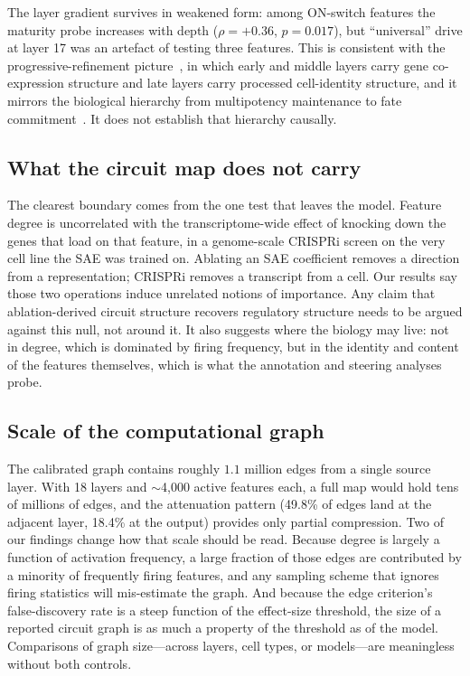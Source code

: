 \documentclass[11pt,onecolumn]{article}
\begin{document}
The layer gradient survives in weakened form: among ON-switch features the maturity probe increases with depth ($\rho=+0.36$, $p=0.017$), but ``universal'' drive at layer 17 was an artefact of testing three features. This is consistent with the progressive-refinement picture~\citep{kendiukhov2025circuits}, in which early and middle layers carry gene co-expression structure and late layers carry processed cell-identity structure, and it mirrors the biological hierarchy from multipotency maintenance to fate commitment~\citep{orkin2008hematopoiesis,graf2009forcing}. It does not establish that hierarchy causally.

\subsection{What the circuit map does not carry}

The clearest boundary comes from the one test that leaves the model. Feature degree is uncorrelated with the transcriptome-wide effect of knocking down the genes that load on that feature, in a genome-scale CRISPRi screen on the very cell line the SAE was trained on. Ablating an SAE coefficient removes a direction from a representation; CRISPRi removes a transcript from a cell. Our results say those two operations induce unrelated notions of importance. Any claim that ablation-derived circuit structure recovers regulatory structure needs to be argued against this null, not around it. It also suggests where the biology may live: not in degree, which is dominated by firing frequency, but in the identity and content of the features themselves, which is what the annotation and steering analyses probe.

\subsection{Scale of the computational graph}

The calibrated graph contains roughly $1.1$ million edges from a single source layer. With 18 layers and $\sim$4{,}000 active features each, a full map would hold tens of millions of edges, and the attenuation pattern (49.8\% of edges land at the adjacent layer, 18.4\% at the output) provides only partial compression. Two of our findings change how that scale should be read. Because degree is largely a function of activation frequency, a large fraction of those edges are contributed by a minority of frequently firing features, and any sampling scheme that ignores firing statistics will mis-estimate the graph. And because the edge criterion's false-discovery rate is a steep function of the effect-size threshold, the size of a reported circuit graph is as much a property of the threshold as of the model. Comparisons of graph size---across layers, cell types, or models---are meaningless without both controls.
\end{document}
